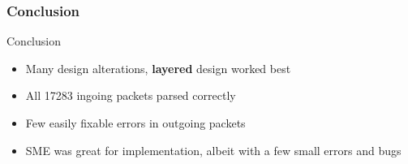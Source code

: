 \begin{frame}
  \frametitle{Conclusion}


\begin{block}{Conclusion}
\begin{itemize}
	\item Many design alterations, \textbf{layered} design worked best
\item All 17283 ingoing packets parsed correctly
\item Few easily fixable errors in outgoing packets
\item SME was great for implementation, albeit with a few small errors and bugs

\end{itemize}

\end{block}
\end{frame}

